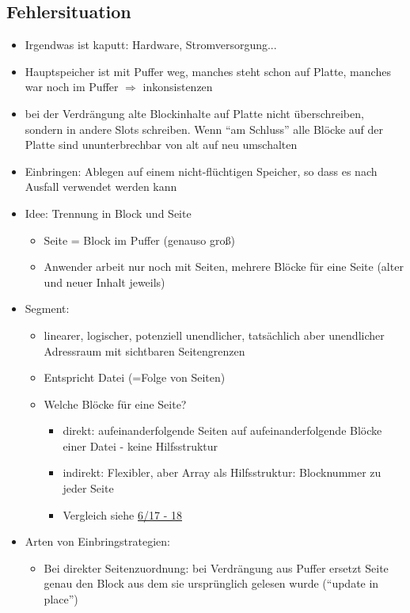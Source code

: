 \documentclass[a4paper, 12pt]{scrartcl}
\begin{document}
\subsection{Fehlersituation}
\begin{itemize}
	\item
		Irgendwas ist kaputt: Hardware, Stromversorgung...
	\item
		Hauptspeicher ist mit Puffer weg, manches steht schon auf Platte, manches war noch im Puffer $\Rightarrow$ inkonsistenzen
	\item
		bei der Verdrängung alte Blockinhalte auf Platte nicht überschreiben, sondern in andere Slots schreiben. Wenn \enquote{am Schluss} alle Blöcke auf der Platte sind ununterbrechbar von alt auf neu umschalten
	\item
		Einbringen: Ablegen auf einem nicht-flüchtigen Speicher, so dass es nach Ausfall verwendet werden kann
	\item
		Idee: Trennung in Block und Seite
		\begin{itemize}
			\item
				Seite = Block im Puffer (genauso groß)
			\item
				Anwender arbeit nur noch mit Seiten, mehrere Blöcke für eine Seite (alter und neuer Inhalt jeweils)
		\end{itemize}
	\item Segment:
		\begin{itemize}
			\item
				linearer, logischer, potenziell unendlicher, tatsächlich aber unendlicher Adressraum mit sichtbaren Seitengrenzen
			\item
				Entspricht Datei (=Folge von Seiten)
			\item
				Welche Blöcke für eine Seite?
				\begin{itemize}
					\item
						direkt: aufeinanderfolgende Seiten auf aufeinanderfolgende Blöcke einer Datei - keine Hilfsstruktur
					\item
						indirekt: Flexibler, aber Array als Hilfsstruktur: Blocknummer zu jeder Seite
					\item
						Vergleich siehe \href{site:IDB-2015WS-06-Puffer.pdf}{6/17 - 18}
				\end{itemize}
		\end{itemize}
	\item
		Arten von Einbringstrategien:
		\begin{itemize}
			\item
				Bei direkter Seitenzuordnung: bei Verdrängung aus Puffer ersetzt Seite genau den Block aus dem sie ursprünglich gelesen wurde (\enquote{update in place})

\end{itemize}
\end{itemize}
\end{document}
